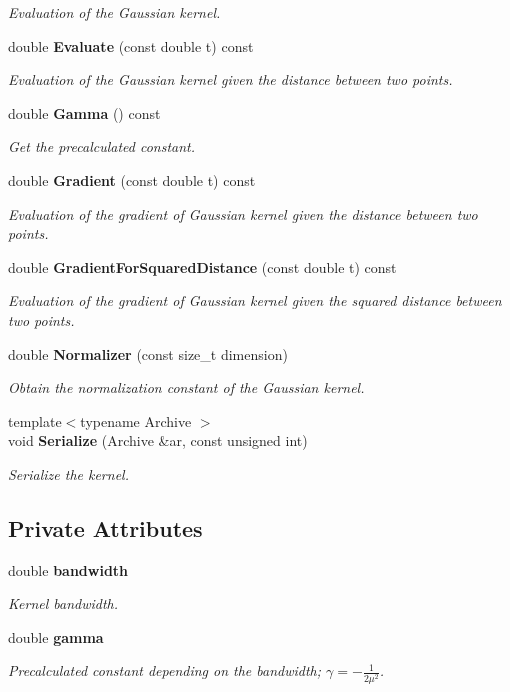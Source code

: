 \begin{DoxyCompactItemize}
\begin{DoxyCompactList}\small\item\em Evaluation of the Gaussian kernel. \end{DoxyCompactList}\item 
double {\bf Evaluate} (const double t) const 
\begin{DoxyCompactList}\small\item\em Evaluation of the Gaussian kernel given the distance between two points. \end{DoxyCompactList}\item 
double {\bf Gamma} () const 
\begin{DoxyCompactList}\small\item\em Get the precalculated constant. \end{DoxyCompactList}\item 
double {\bf Gradient} (const double t) const 
\begin{DoxyCompactList}\small\item\em Evaluation of the gradient of Gaussian kernel given the distance between two points. \end{DoxyCompactList}\item 
double {\bf Gradient\+For\+Squared\+Distance} (const double t) const 
\begin{DoxyCompactList}\small\item\em Evaluation of the gradient of Gaussian kernel given the squared distance between two points. \end{DoxyCompactList}\item 
double {\bf Normalizer} (const size\+\_\+t dimension)
\begin{DoxyCompactList}\small\item\em Obtain the normalization constant of the Gaussian kernel. \end{DoxyCompactList}\item 
{\footnotesize template$<$typename Archive $>$ }\\void {\bf Serialize} (Archive \&ar, const unsigned int)
\begin{DoxyCompactList}\small\item\em Serialize the kernel. \end{DoxyCompactList}\end{DoxyCompactItemize}
\subsection*{Private Attributes}
\begin{DoxyCompactItemize}
\item 
double {\bf bandwidth}
\begin{DoxyCompactList}\small\item\em Kernel bandwidth. \end{DoxyCompactList}\item 
double {\bf gamma}
\begin{DoxyCompactList}\small\item\em Precalculated constant depending on the bandwidth; $ \gamma = -\frac{1}{2 \mu^2} $. \end{DoxyCompactList}\end{DoxyCompactItemize}


